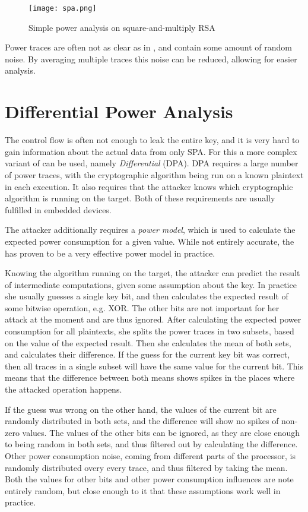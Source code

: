\begin{figure}[h]
  \centering
  \texttt{[image: spa.png]}
  \caption{Simple power analysis on square-and-multiply RSA\cite{boehme2017netsec}}
  \label{fig:spa}
\end{figure}

Power traces are often not as clear as in , and contain some amount of random noise.
By averaging multiple traces this noise can be reduced, allowing for easier analysis.

\section{Differential Power Analysis}
The control flow is often not enough to leak the entire key, and it is very hard to gain information about the actual data from only SPA.
For this a more complex variant of \poweranalysis{} can be used, namely \emph{Differential \poweranalysis{}} (DPA).
DPA requires a large number of power traces, with the cryptographic algorithm being run on a known plaintext in each execution.
It also requires that the attacker knows which cryptographic algorithm is running on the target.
Both of these requirements are usually fulfilled in embedded devices.

The attacker additionally requires a \emph{power model}, which is used to calculate the expected power consumption for a given value.
While not entirely accurate\cite{brier2004correlation}, the \hammingw{} has proven to be a very effective power model in practice.

Knowing the algorithm running on the target, the attacker can predict the result of intermediate computations, given some assumption about the key.
In practice she usually guesses a single key bit, and then calculates the expected result of some bitwise operation, e.g. XOR.
The other bits are not important for her attack at the moment and are thus ignored.
After calculating the expected power consumption for all plaintexts, she splits the power traces in two subsets, based on the value of the expected result.
Then she calculates the mean of both sets, and calculates their difference.
If the guess for the current key bit was correct, then all traces in a single subset will have the same value for the current bit.
This means that the difference between both means shows spikes in the places where the attacked operation happens.

If the guess was wrong on the other hand, the values of the current bit are randomly distributed in both sets, and the difference will show no spikes of non-zero values.
The values of the other bits can be ignored, as they are close enough to being random in both sets, and thus filtered out by calculating the difference.
Other power consumption noise, coming from different parts of the processor, is randomly distributed overy every trace, and thus filtered by taking the mean.
Both the values for other bits and other power consumption influences are note entirely random, but close enough to it that these assumptions work well in practice.

